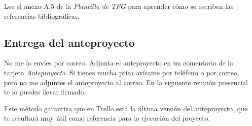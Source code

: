 Lee el anexo A.5 de la \emph{Plantilla de TFG} para aprender cómo se escriben las referencias bibliográficas.

\subsection{Entrega del anteproyecto}

No me lo envíes por correo.  Adjunta el anteproyecto en un comentario de la tarjeta \emph{Anteproyecto}.  Si tienes mucha prisa avísame por teléfono o por correo, pero no me adjuntes el anteproyecto al correo.  En la siguiente reunión presencial te lo puedes llevar firmado.

Este método garantiza que en Trello está la última versión del anteproyecto, que te resultará muy útil como referencia para la ejecución del proyecto.